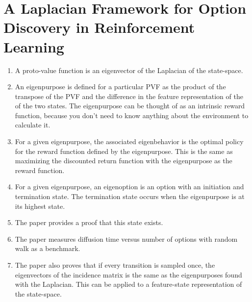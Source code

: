 \section{A Laplacian Framework for Option Discovery in Reinforcement Learning}
\begin{enumerate}
\item A proto-value function is an eigenvector of the Laplacian of the state-space.
\item An eigenpurpose is defined for a particular PVF as the product of the transpose of the PVF and the difference in the feature representation of the of the two states. The eigenpurpose can be thought of as an intrinsic reward function, because you don’t need to know anything about the environment to calculate it.
\item For a given eigenpurpose, the associated eigenbehavior is the optimal policy for the reward function defined by the eigenpurpose. This is the same as maximizing the discounted return function with the eigenpurpose as the reward function.
\item For a given eigenpurpose, an eigenoption is an option with an initiation and termination state. The termination state occurs when the eigenpurpose is at its highest state. \item The paper provides a proof that this state exists.
\item The paper measures diffusion time versus number of options with random walk as a benchmark.
\item The paper also proves that if every transition is sampled once, the eigenvectors of the incidence matrix is the same as the eigenpurposes found with the Laplacian. This can be applied to a feature-state representation of the state-space.
\end{enumerate}


